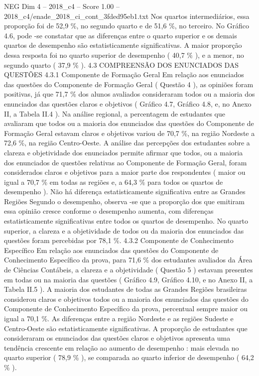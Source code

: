 \begin{textsample}{NEG Dim 4 – 2018\_c4 – Score 1.00 – 2018\_c4/enade\_2018\_ci\_cont\_3fded95eb1.txt}
Nos quartos intermediários, essa proporção foi de 52,9 \%, no segundo quarto e de 51,6 \%, no terceiro.
No Gráfico 4.6, pode -se constatar que as diferenças entre o quarto superior e os demais quartos de desempenho são estatisticamente significativas.
A maior proporção dessa resposta foi no quarto superior de desempenho ( 40,7 \% ), e a menor, no segundo quarto ( 37,9 \% ). 4.3 COMPREENSÃO DOS ENUNCIADOS DAS QUESTÕES 4.3.1 Componente de Formação Geral Em relação aos enunciados das questões do Componente de Formação Geral ( Questão 4 ), as opiniões foram positivas, já que 71,7 \% dos alunos avaliados consideraram todos ou a maioria dos enunciados das questões claros e objetivos ( Gráfico 4.7, Gráfico 4.8, e, no Anexo II, a Tabela II.4 ).
Na análise regional, a percentagem de estudantes que avaliaram que todos ou a maioria dos enunciados das questões do Componente de Formação Geral estavam claros e objetivos variou de 70,7 \%, na região Nordeste a 72,6 \%, na região Centro-Oeste.
A análise das percepções dos estudantes sobre a clareza e objetividade dos enunciados permite afirmar que todos, ou a maioria dos enunciados de questões relativas ao Componente de Formação Geral, foram considerados claros e objetivos para a maior parte dos respondentes ( maior ou igual a 70,7 \% em todas as regiões e, a 64,3 \% para todos os quartos de desempenho ).
Não há diferença estatisticamente significativa entre as Grandes Regiões Segundo o desempenho, observa -se que a proporção dos que emitiram essa opinião cresce conforme o desempenho aumenta, com diferenças estatisticamente significativas entre todos os quartos de desempenho.
No quarto superior, a clareza e a objetividade de todos ou da maioria dos enunciados das questões foram percebidas por 78,1 \%. 4.3.2 Componente de Conhecimento Específico Em relação aos enunciados das questões do Componente de Conhecimento Específico da prova, para 71,6 \% dos estudantes avaliados da Área de Ciências Contábeis, a clareza e a objetividade ( Questão 5 ) estavam presentes em todas ou na maioria das questões ( Gráfico 4.9, Gráfico 4.10, e no Anexo II, a Tabela II.5 ).
A maioria dos estudantes de todas as Grandes Regiões brasileiras considerou claros e objetivos todos ou a maioria dos enunciados das questões do Componente de Conhecimento Específico da prova, percentual sempre maior ou igual a 70,1 \%.
As diferenças entre a região Nordeste e as regiões Sudeste e Centro-Oeste são estatisticamente significativas.
A proporção de estudantes que consideraram os enunciados das questões claros e objetivos apresenta uma tendência crescente em relação ao aumento de desempenho : mais elevada no quarto superior ( 78,9 \% ), se comparada ao quarto inferior de desempenho ( 64,2 \% ).

\end{textsample}
